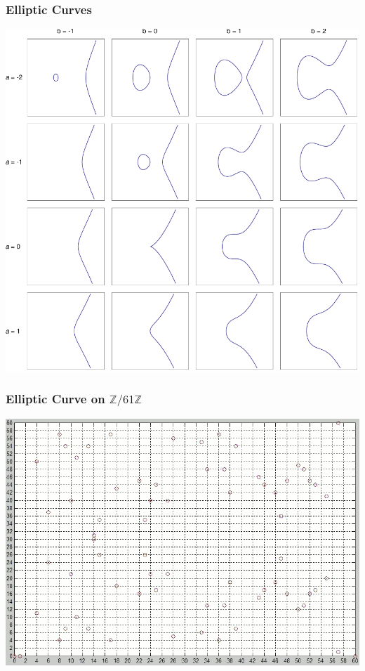 \documentclass{beamer}
\newcommand{\zmod}[1]{\ensuremath{\mathbb{Z}/#1\mathbb{Z}}}
\begin{document}
    \begin{frame}
        \frametitle{Elliptic Curves}
        \centering
        \includegraphics[height=.9\textheight]{EllipticCurveCatalog.pdf}
    \end{frame}

    \begin{frame}
        \frametitle{Elliptic Curve on \zmod{61}}
        \centering
        \includegraphics[height=.9\textheight]{EllipticCurveOnFiniteField.png}
    \end{frame}
\end{document}
